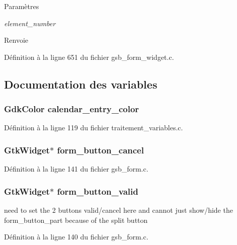 \begin{DoxyParams}{Paramètres}
\item[{\em element\_\-number}]\end{DoxyParams}
\begin{DoxyReturn}{Renvoie}

\end{DoxyReturn}


Définition à la ligne 651 du fichier gsb\_\-form\_\-widget.c.



\subsection{Documentation des variables}
\subsubsection[{calendar\_\-entry\_\-color}]{\setlength{\rightskip}{0pt plus 5cm}GdkColor {\bf calendar\_\-entry\_\-color}}\label{gsb__form__widget_8c_aa809fea280ab9cef6e16774b54a573ae}


Définition à la ligne 119 du fichier traitement\_\-variables.c.

\subsubsection[{form\_\-button\_\-cancel}]{\setlength{\rightskip}{0pt plus 5cm}GtkWidget$\ast$ {\bf form\_\-button\_\-cancel}}\label{gsb__form__widget_8c_ae8d7190a1fb3183b5b2230a299e1ec3d}


Définition à la ligne 141 du fichier gsb\_\-form.c.

\subsubsection[{form\_\-button\_\-valid}]{\setlength{\rightskip}{0pt plus 5cm}GtkWidget$\ast$ {\bf form\_\-button\_\-valid}}\label{gsb__form__widget_8c_ab8cc725a56b7979ec55e7b4625d0b66c}
need to set the 2 buttons valid/cancel here and cannot just show/hide the form\_\-button\_\-part because of the split button 

Définition à la ligne 140 du fichier gsb\_\-form.c.

